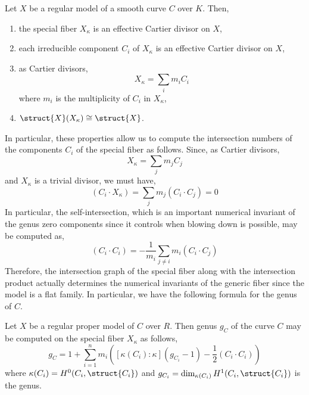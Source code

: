 \begin{lemma}
Let $X$ be a regular model of a smooth curve $C$ over $K$. Then,
\begin{enumerate}
\item the special fiber $X_\kappa$ is an effective Cartier divisor on $X$,
\item each irreducible component $C_i$ of $X_\kappa$ is an effective Cartier divisor on $X$,
\item as Cartier divisors,
\[ X_\kappa = \sum_i m_i C_i \]
where $m_i$ is the multiplicity of $C_i$ in $X_\kappa$,
\item $\struct{X}(X_\kappa) \cong \struct{X}$. 
\end{enumerate}
\end{lemma}
\noindent
In particular, these properties allow us to compute the intersection numbers of the components $C_i$ of the special fiber as follows. Since, as Cartier divisors,
\[ X_\kappa = \sum_j m_j C_j \]
and $X_\kappa$ is a trivial divisor, we must have, 
\[ (C_i \cdot X_\kappa) = \sum_{j} m_j (C_i \cdot C_j) = 0 \]
In particular, the self-intersection, which is an important numerical invariant of the genus zero components since it controls when blowing down is possible, may be computed as,
\[ (C_i \cdot C_i) = - \frac{1}{m_i} \sum_{j \neq i} m_i (C_i \cdot C_j) \]
Therefore, the intersection graph of the special fiber along with the intersection product actually determines the numerical invariants of the generic fiber since the model is a flat family. In particular, we have the following formula for the genus of $C$.

\begin{prop}
Let $X$ be a regular proper model of $C$ over $R$. Then genus $g_C$ of the curve $C$ may be computed on the special fiber $X_\kappa$ as follows,
\[ g_C = 1 + \sum_{i = 1}^n m_i \left( [\kappa(C_i) : \kappa] (g_{C_i} - 1) - \frac{1}{2} (C_i \cdot C_i) \right) \]
where $\kappa(C_i) = H^0(C_i, \struct{C_i})$ and $g_{C_i} = \dim_{\kappa(C_i)} H^1(C_i, \struct{C_i})$ is the genus.
\end{prop}
